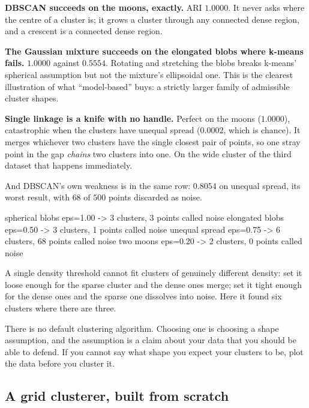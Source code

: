 \documentclass[11pt]{article}
\begin{document}
\textbf{DBSCAN succeeds on the moons, exactly.} ARI $1.0000$. It never asks
where the centre of a cluster is; it grows a cluster through any connected
dense region, and a crescent is a connected dense region.

\textbf{The Gaussian mixture succeeds on the elongated blobs where k-means
fails.} $1.0000$ against $0.5554$. Rotating and stretching the blobs breaks
k-means' spherical assumption but not the mixture's ellipsoidal one. This is
the clearest illustration of what ``model-based'' buys: a strictly larger
family of admissible cluster shapes.

\textbf{Single linkage is a knife with no handle.} Perfect on the moons
($1.0000$), catastrophic when the clusters have unequal spread
($\mathbf{0.0002}$, which is chance). It merges whichever two clusters have
the single closest pair of points, so one stray point in the gap
\emph{chains} two clusters into one. On the wide cluster of the third dataset
that happens immediately.

And DBSCAN's own weakness is in the same row: $0.8054$ on unequal spread, its
worst result, with $68$ of $500$ points discarded as noise.

\begin{codeout}
spherical blobs   eps=1.00 -> 3 clusters,   3 points called noise
elongated blobs   eps=0.50 -> 3 clusters,   1 points called noise
unequal spread    eps=0.75 -> 6 clusters,  68 points called noise
two moons         eps=0.20 -> 2 clusters,   0 points called noise
\end{codeout}

A single density threshold cannot fit clusters of genuinely different density:
set it loose enough for the sparse cluster and the dense ones merge; set it
tight enough for the dense ones and the sparse one dissolves into noise. Here
it found six clusters where there are three.

\begin{keyidea}
There is no default clustering algorithm. Choosing one is choosing a shape
assumption, and the assumption is a claim about your data that you should be
able to defend. If you cannot say what shape you expect your clusters to be,
plot the data before you cluster it.
\end{keyidea}

\subsection{A grid clusterer, built from scratch}
\label{sec:grid}
\end{document}
